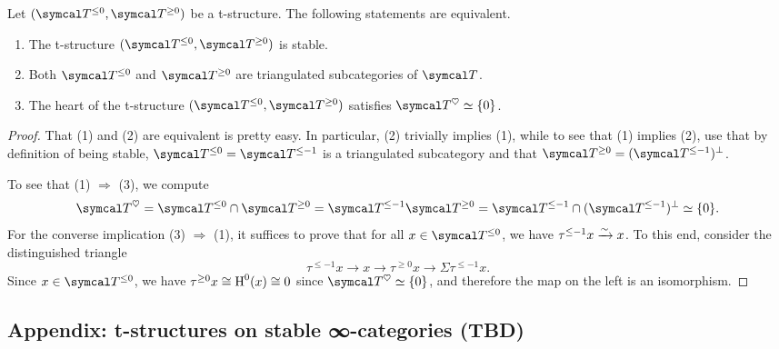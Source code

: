 \begin{proposition}
	Let \((\calT^{\leq 0},\calT^{\geq 0})\) be a t-structure. The following statements are equivalent.
	\begin{enumerate}[label=(\arabic*)]
		\item The t-structure \((\calT^{\leq 0},\calT^{\geq 0})\) is stable.
		\item Both \(\calT^{\leq0}\) and \(\calT^{\geq0}\) are triangulated subcategories of \(\calT\).
		\item The heart of the t-structure \((\calT^{\leq 0},\calT^{\geq 0})\) satisfies \(\calT^\heartsuit\simeq\{0\}\).
	\end{enumerate}
\end{proposition}
\begin{proof}
That (1) and (2) are equivalent is pretty easy. In particular, (2) trivially implies (1), while to see that (1) implies (2), use that by definition of being
stable, \(\calT^{\leq 0} = \calT^{\leq -1}\) is a triangulated subcategory and that \(\calT^{\geq 0} = (\calT^{\leq -1})^\perp\).

To see that (1) \(\Rightarrow\) (3), we compute
\[ \calT^\heartsuit = \calT^{\leq 0}\cap\calT^{\geq0} = \calT^{\leq -1}\calT^{\geq 0} = \calT^{\leq -1} \cap (\calT^{\leq -1})^\perp \simeq \{0\}. \]
For the converse implication (3) \(\Rightarrow\) (1), it suffices to prove that for all \(x\in\calT^{\leq 0}\), we have \(\tau^{\leq -1}x \xrightarrow{\sim} x\).
To this end, consider the distinguished triangle
\[ \tau^{\leq -1}x \to x \to \tau^{\geq 0}x \to \Sigma\tau^{\leq -1}x. \]
Since \(x\in\calT^{\leq 0}\), we have \(\tau^{\geq 0}x \cong \operatorname{H}^0(x)\cong 0\) since \(\calT^\heartsuit\simeq\{0\}\), and therefore
the map on the left is an isomorphism.
\end{proof}

\subsection{Appendix: t-structures on stable ∞-categories (TBD)}

